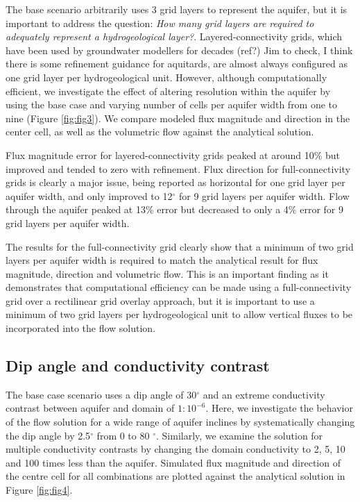 \documentclass{article}
\begin{document}
The base scenario arbitrarily uses 3 grid layers to represent the aquifer, but it is important to address the question: \emph{How many grid layers are required to adequately represent a hydrogeological layer?}. Layered-connectivity grids, which have been used by groundwater modellers for decades (ref?) {\color{red} Jim to check, I think there is some refinement guidance for aquitards}, are almost always configured as one grid layer per hydrogeological unit. However, although computationally efficient, we investigate the effect of altering resolution within the aquifer by using the base case and varying number of cells per aquifer width from one to nine (Figure \ref{fig:fig3}). We compare modeled flux magnitude and direction in the center cell, as well as the volumetric flow against the analytical solution.

Flux magnitude error for layered-connectivity grids peaked at around 10\% but improved and tended to zero with refinement. Flux direction for full-connectivity grids is clearly a major issue, being reported as horizontal for one grid layer per aquifer width, and only improved to 12$^{\circ}$ for 9 grid layers per aquifer width. Flow through the aquifer peaked at 13\% error but decreased to only a 4\% error for 9 grid layers per aquifer width.

The results for the full-connectivity grid clearly show that a minimum of two grid layers per aquifer width is required to match the analytical result for flux magnitude, direction and volumetric flow. This is an important finding as it demonstrates that computational efficiency can be made using a full-connectivity grid over a rectilinear grid overlay approach, but it is important to use a minimum of two grid layers per hydrogeological unit to allow vertical fluxes to be incorporated into the flow solution. 

\subsection{Dip angle and conductivity contrast}

The base case scenario uses a dip angle of 30$^{\circ}$ and an extreme conductivity contrast between aquifer and domain of $1:10^{-6}$. Here, we investigate the behavior of the flow solution for a wide range of aquifer inclines by systematically changing the dip angle by 2.5$^{\circ}$ from 0 to 80 $^{\circ}$. Similarly, we examine the solution for multiple conductivity contrasts by changing the domain conductivity to 2, 5, 10 and 100 times less than the aquifer. Simulated flux magnitude and direction of the centre cell for all combinations are plotted against the analytical solution in Figure \ref{fig:fig4}. 
\end{document}
